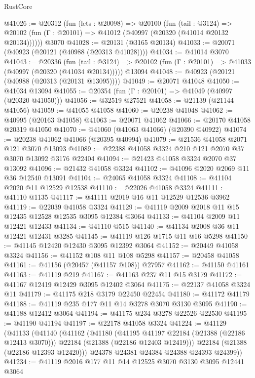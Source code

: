 \begin{lexlean}{RustCore}
\begin{coremodule}
@41026 := @20312
    (fun (lets : @20098) =>
    @20100
      (fun (tail : @3124) =>
      @20102 (fun (Γ : @20101) => @41012 (@40997 (@20320 (@41014 @20132 @20134))))))
    @3070
@41028 := @20131 (@3165 @20134)
@41033 := @20071 (@40923 (@20121 (@40988 (@20313 @41028))))
@41034 := @41014 @3070
@41043 := @20336
    (fun (tail : @3124) => @20102 (fun (Γ : @20101) => @41033 (@40997 (@20320 (@41034 @20134)))))
    @13094
@41048 := @40923 (@20121 (@40988 (@20313 (@20131 @13095))))
@41049 := @20071 @41048
@41050 := @41034 @13094
@41055 := @20354 (fun (Γ : @20101) => @41049 (@40997 (@20320 @41050)))
@41056 := @32519 @27521
@41058 := @21139 (@21144 @41056)
@41059 := @41055 @41058
@41060 := @20238 @41048
@41062 := @40995 (@20163 @41058)
@41063 := @20071 @41062
@41066 := @20170 @41058 @20319 @41050
@41070 := @41060 (@41063 @41066) (@20390 @40922)
@41074 := @20238 @41062 @41066 (@20395 @40994)
@41079 := @21536 @41058 @2071 @121 @3070 @13093
@41089 := @22388 @41058 @3324 @210 @121 @2070 @37 @3070 @13092 @3176 @22404
@41094 := @21423 @41058 @3324 @2070 @37 @13092
@41096 := @21432 @41058 @3324
@41102 := @41096 @2020 @2069 @11 @36 @12540 @13091
@41104 := @24065 @41058 @3324
@41108 := @41104 @2020 @11 @12529 @12538
@41110 := @22026 @41058 @3324
@41111 := @41110 @1135
@41117 := @41111 @2019 @16 @11 @12529 @12536 @3962
@41119 := @22039 @41058 @3324
@41129 := @41119 @2009 @2018 @11 @15 @12435 @12528 @12535 @3095 @12384 @3064
@41133 := @41104 @2009 @11 @12421 @12433
@41134 := @41110 @515
@41140 := @41134 @2008 @36 @11 @12421 @12431 @3285
@41145 := @41119 @126 @1715 @11 @16 @5298
@41150 := @41145 @12420 @12430 @3095 @12392 @3064
@41152 := @20449 @41058 @3324
@41156 := @41152 @108 @11 @108 @5298
@41157 := @20458 @41058
@41161 := @41156 (@20457 (@41157 @108)) @27957
@41162 := @41150 @41161
@41163 := @41119 @219
@41167 := @41163 @237 @11 @15 @3179
@41172 := @41167 @12419 @12429 @3095 @12402 @3064
@41175 := @22137 @41058 @3324 @11
@41179 := @41175 @218 @3179 @22450 @22454
@41180 := @41172 @41179
@41188 := @41119 @235 @177 @11 @14 @3278 @3070 @3130 @3095
@41190 := @41188 @12412 @3064
@41194 := @41175 @234 @3278 @22526 @22530
@41195 := @41190 @41194
@41197 := @22178 @41058 @3324
@41224 := @41129
    (@41133
      (@41140
        (@41162
          (@41180
            (@41195 @41197 @22184 (@21388 (@22186 @12413 @3070)))
            @22184
            (@21388 (@22186 @12403 @12419)))
          @22184
          (@21388 (@22186 @12393 @12420)))
        @24378
        @24381
        @24384
        @24388
        @24393
        @24399))
@41234 := @41119 @2016 @177 @11 @14 @12525 @3070 @3130 @3095 @12441 @3064

\end{coremodule}
\end{lexlean}
